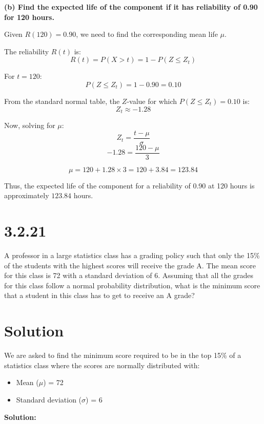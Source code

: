 \documentclass{article}
\begin{document}
\vspace{5mm} %

\textbf{\large(b) Find the expected life of the component if it has reliability of 0.90 for 120 hours.\newline}


Given \(R(120) = 0.90\), we need to find the corresponding mean life \(\mu\).

The reliability \(R(t)\) is:
\[
R(t) = P(X > t) = 1 - P(Z \leq Z_t)
\]

For \(t = 120\):
\[
P(Z \leq Z_t) = 1 - 0.90 = 0.10
\]

From the standard normal table, the \(Z\)-value for which \(P(Z \leq Z_t) = 0.10\) is:
\[
Z_t \approx -1.28
\]

Now, solving for \(\mu\):
\[
Z_t = \frac{t - \mu}{\sigma}
\]
\[
-1.28 = \frac{120 - \mu}{3}
\]

\[
\mu = 120 + 1.28 \times 3 = 120 + 3.84 = 123.84
\]

Thus, the expected life of the component for a reliability of 0.90 at 120 hours is approximately \(123.84\) hours.


\section*{3.2.21}

A professor in a large statistics class has a grading policy such that only the 15\% of the students with the highest scores will receive the grade A. The mean score for this class is 72 with a standard deviation of 6. Assuming that all the grades for this class follow a normal probability distribution, what is the minimum score that a student in this class has to get to receive an A grade?


\section*{Solution}

We are asked to find the minimum score required to be in the top 15\% of a statistics class where the scores are normally distributed with:
\begin{itemize}
    \item Mean (\(\mu\)) = 72
    \item Standard deviation (\(\sigma\)) = 6
\end{itemize}

\textbf{Solution:}
\end{document}
